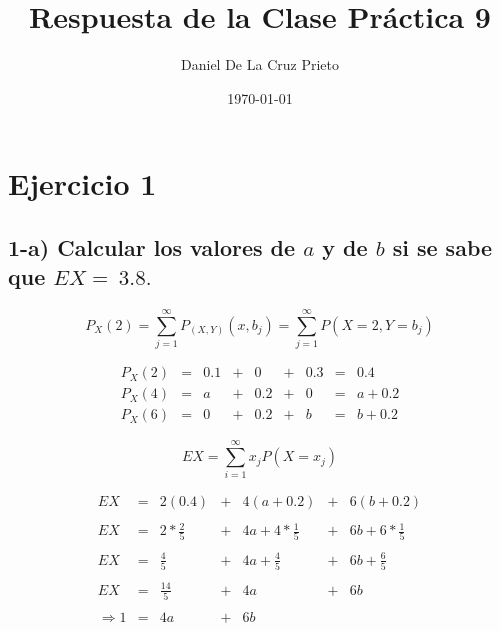\documentclass[12pt]{article}
\begin{document}
\title{Respuesta de la Clase Pr\'actica 9}
\author{Daniel De La Cruz Prieto}
\date{\today}

\maketitle


\section*{Ejercicio 1}

\subsection*{1-a) Calcular los valores de $a$ y de $b$ si se sabe que $EX =~ 3.8.$}

\begin{equation*}
    P_X\left(2\right) = \sum_{j=1}^{\infty}	P_{\left(X,Y\right)} \left(x,b_j\right) = \sum_{j=1}^{\infty} P\left(X=2,Y=b_j\right)
\end{equation*}

\begin{equation*}
    \begin{array}{rcccccccl}
        P_X\left(2\right) & = & 0.1 & + & 0   & + & 0.3 & = & 0.4
        \\
        P_X\left(4\right) & = & a   & + & 0.2 & + & 0   & = & a + 0.2
        \\
        P_X\left(6\right) & = & 0   & + & 0.2 & + & b   & = & b + 0.2
    \end{array}
\end{equation*}

\begin{equation*}
    EX = \sum_{i=1}^{\infty} x_j P\left(X=x_j\right)
\end{equation*}

\begin{equation*}
    \begin{array}{rcccccl}
        EX            & = & 2(0.4)          & + & 4(a+0.2)             & + & 6(b+0.2)
        \\
        \\
        EX            & = & 2 * \frac{2}{5} & + & 4a + 4 * \frac{1}{5} & + & 6b + 6 * \frac{1}{5}
        \\
        \\
        EX            & = & \frac{4}{5}     & + & 4a + \frac{4}{5}     & + & 6b + \frac{6}{5}
        \\
        \\
        EX            & = & \frac{14}{5}    & + & 4a                   & + & 6b
        \\
        \\
        \Rightarrow 1 & = & 4a              & + & 6b
    \end{array}
\end{equation*}
\end{document}
